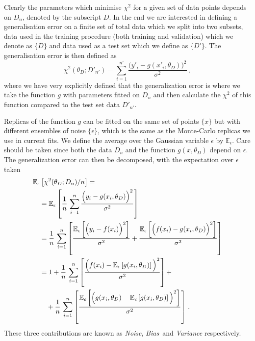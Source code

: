 Clearly the parameters which minimise $\chi^2$ for a given set of data points
depends on $D_n$, denoted by the subscript $D$. In the end we are interested in
defining a generalisation error on a finite set of total data which we split
into two subsets, data used in the training procedure
(both training and validation) which we denote as $\{ D \}$
and data used as a test set which we define as $\{ D' \}$. The generalisation
error is then defined as
\begin{equation}
    \label{eq:DefGenErr}
    \chi^2(\theta_D; D'_{n'}) = \sum_{i=1}^{n'}
    \frac{\Big(
        y'_i - g(x'_i,\theta_D)
    \Big)^2}{\sigma^2}\, ,
\end{equation}
where we have very explicitly defined that the generalization error is where we
take the function $g$ with parameters fitted on $D_n$ and then calculate the
$\chi^2$ of this function compared to the test set data $D'_{n'}$.

Replicas of the function $g$ can be fitted on the same set of points $\{ x\}$
but with different ensembles of noise $\{ \epsilon\} $, which is the same as
the Monte-Carlo replicas we use in current fits. We define the average over the
Gaussian variable $\epsilon$ by $\mathbb{E}_\epsilon$. Care should be taken
since both the data $D_n$ and the function $g(x,\theta_D)$ depend on $\epsilon$.
The generalization error can then be decomposed, with the expectation over
$\epsilon$ taken
\begin{align}
    \label{eq:GenErr}
    &\mathbb{E}_{\epsilon}\left[\chi^2(\theta_D; D_n)/n\right] = \nonumber \\
    &\quad = \mathbb{E}_{\epsilon}\left[
        \frac{1}{n}\, \sum_{i=1}^n 
        \frac{\Big(
            y_i - g(x_i,\theta_D)
        \Big)^2}{\sigma^2}   
    \right] \\
    &\quad = \frac{1}{n}\, \sum_{i=1}^n \left[
        \frac{\mathbb{E}_\epsilon\left[
            \Big(y_i - f(x_i)\Big)^2    
        \right]}{\sigma^2}    
        + \frac{\mathbb{E}_{\epsilon}\left[\Big(f(x_i)-g(x_i,\theta_D)\Big)^2\right]}{\sigma^2}
    \right] \\
    &\quad = 1 + \frac{1}{n}\, \sum_{i=1}^n \left[
            \frac{\Big(f(x_i) - \mathbb{E}_{\epsilon}\left[g(x_i,\theta_D)\right]\Big)^2}{\sigma^2}
        \right] + \nonumber \\
    &\quad \quad +
        \frac{1}{n}\, \sum_{i=1}^n \left[
            \frac{
                \mathbb{E}_{\epsilon}\left[\Big(g(x_i,\theta_D) - 
                \mathbb{E}_{\epsilon}\left[g(x_i,\theta_D)\right]\Big)^2\right]
            }{\sigma^2}
        \right]\, . 
\end{align}
These three contributions are known as {\em Noise}, {\em Bias}\ and {\em Variance}
respectively.

